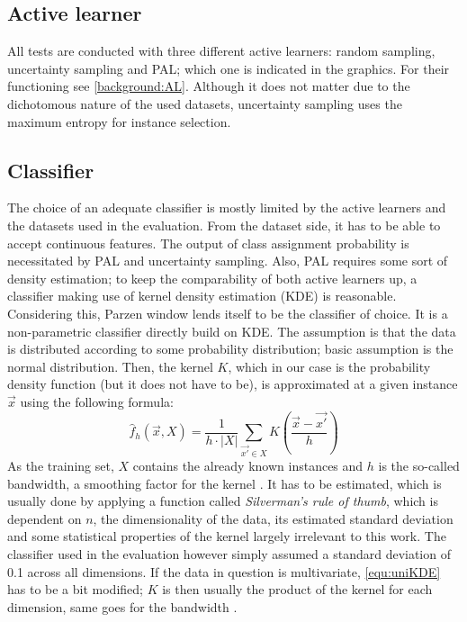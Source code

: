 \subsection{Active learner}

All tests are conducted with three different active learners: random sampling, uncertainty sampling and PAL; which one is indicated in the graphics. For their functioning see \ref{background:AL}. Although it does not matter due to the dichotomous nature of the used datasets, uncertainty sampling uses the maximum entropy for instance selection.

\subsection{Classifier}
\label{evaluation:classifier}
The choice of an adequate classifier is mostly limited by the active learners and the datasets used in the evaluation. From the dataset side, it has to be able to accept continuous features. The output of class assignment probability is necessitated by PAL and uncertainty sampling. Also, PAL requires some sort of density estimation; to keep the comparability of both active learners up, a classifier making use of kernel density estimation (KDE) is reasonable. Considering this, Parzen window lends itself to be the classifier of choice. It is a non-parametric classifier directly build on KDE. The assumption is that the data is distributed according to some probability distribution; basic assumption is the normal distribution. Then, the kernel $K$, which in our case is the probability density function (but it does not have to be), is approximated at a given instance $\vec{x}$ using the following formula:
\begin{equation}
\label{equ:uniKDE}
\hat{f}_h(\vec{x}, X) = \frac{1}{h \cdot |X|} \sum_{\vec{x'} \in X}^{} K(\frac{\vec{x}-\vec{x'}}{h})
\end{equation}
As the training set, $X$ contains the already known instances and $h$ is the so-called bandwidth, a smoothing factor for the kernel \cite{SheatherEtAl1991}. It has to be estimated, which is usually done by applying a function called \textit{Silverman's rule of thumb}, which is dependent on $n$, the dimensionality of the data, its estimated standard deviation and some statistical properties of the kernel largely irrelevant to this work. The classifier used in the evaluation however simply assumed a standard deviation of 0.1 across all dimensions. If the data in question is multivariate, \ref{equ:uniKDE} has to be a bit modified; $K$ is then usually the product of the kernel for each dimension, same goes for the bandwidth \cite{Silverman1986}.

